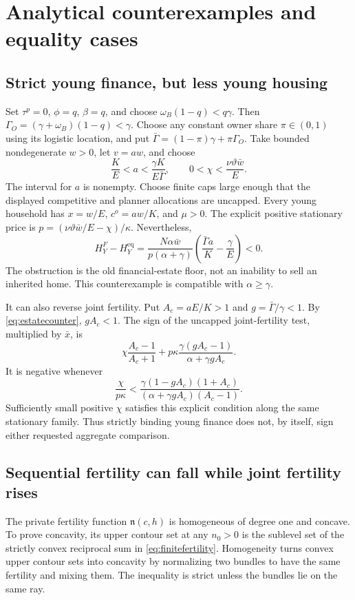 \documentclass[11pt]{article}
\newcommand{\eq}{\mathrm{eq}}
\newcommand{\tht}{\vartheta}
\begin{document}
\section{Analytical counterexamples and equality cases}\label{app:counter}
\subsection{Strict young finance, but less young housing}
Set $\tau^p=0$, $\phi=q$, $\beta=q$, and choose
$\omega_B(1-q)<q\gamma$. Then $\Gamma_O=(\gamma+\omega_B)(1-q)<\gamma$. Choose any constant owner share $\pi\in(0,1)$ using its logistic location, and put $\bar\Gamma=(1-\pi)\gamma+\pi\Gamma_O$. Take bounded nondegenerate $w>0$, let $v=aw$, and choose
\begin{equation}
 \frac KE<a<\frac{\gamma K}{E\bar\Gamma},\qquad
 0<\chi<\frac{\nu\tht\bar w}{E}.\label{eq:estatecounter}
\end{equation}
The interval for $a$ is nonempty. Choose finite caps large enough that the displayed competitive and planner allocations are uncapped. Every young household has $x=w/E$, $c^o=aw/K$, and $\mu>0$. The explicit positive stationary price is
$p=(\nu\tht\bar w/E-\chi)/\kappa$. Nevertheless,
\begin{equation}
 H_Y^F-H_Y^{\eq}
 =\frac{N\alpha\bar w}{p(\alpha+\gamma)}
 \left(\frac{\bar\Gamma a}{K}-\frac\gamma E\right)<0.\label{eq:counterhousing}
\end{equation}
The obstruction is the old financial-estate floor, not an inability to sell an inherited home. This counterexample is compatible with $\alpha\ge\gamma$.

It can also reverse joint fertility. Put $A_c=aE/K>1$ and $g=\bar\Gamma/\gamma<1$. By \eqref{eq:estatecounter}, $gA_c<1$. The sign of the uncapped joint-fertility test, multiplied by $\bar x$, is
\[
 \chi\frac{A_c-1}{A_c+1}
 +p\kappa\frac{\gamma(gA_c-1)}{\alpha+\gamma gA_c}.
\]
It is negative whenever
\begin{equation}
 \frac\chi{p\kappa}<
 \frac{\gamma(1-gA_c)(1+A_c)}{(\alpha+\gamma gA_c)(A_c-1)}.\label{eq:counterjoint}
\end{equation}
Sufficiently small positive $\chi$ satisfies this explicit condition along the same stationary family. Thus strictly binding young finance does not, by itself, sign either requested aggregate comparison.

\subsection{Sequential fertility can fall while joint fertility rises}
The private fertility function $\mathfrak n(c,h)$ is homogeneous of degree one and concave. To prove concavity, its upper contour set at any $n_0>0$ is the sublevel set of the strictly convex reciprocal sum in \eqref{eq:finitefertility}. Homogeneity turns convex upper contour sets into concavity by normalizing two bundles to have the same fertility and mixing them. The inequality is strict unless the bundles lie on the same ray.
\end{document}
